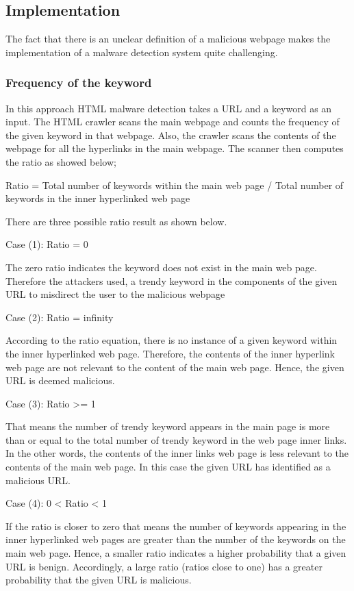 
\subsection{Implementation}
The fact that there is an unclear definition of a malicious webpage makes the implementation of a malware detection system quite challenging. 	  
	

\subsubsection{Frequency of the keyword}
 
In this approach HTML malware detection takes a URL and a keyword as an input. The HTML crawler scans the main webpage and counts the frequency of the given keyword in that webpage. Also, the crawler scans the contents of the webpage for all the hyperlinks in the main webpage. The scanner then computes the ratio as showed below;

Ratio = Total number of keywords within the main web page / Total number of keywords in the inner hyperlinked web page 

There are three possible ratio result as shown below. 

Case (1): Ratio = 0

The zero ratio indicates the keyword does not exist in the main web page. Therefore the attackers used, a trendy keyword in the components of the given URL to misdirect the user to the malicious webpage

Case (2): Ratio = infinity

According to the ratio equation, there is no instance of a given keyword within the inner hyperlinked web page. Therefore, the contents of the inner hyperlink web page are not relevant to the content of the main web page. Hence, the given URL is deemed malicious.

Case (3): Ratio >= 1

That means the number of trendy keyword appears in the main page is more than or equal to the total number of trendy keyword in the web page inner links. In the other words, the contents of the inner links web page is less relevant to the contents of the main web page. In this case the given URL has identified as a malicious URL. 

Case (4): 0 < Ratio < 1

If the ratio is closer to zero that means the number of keywords appearing in the inner hyperlinked web pages are greater than the number of the keywords on the main web page. Hence, a smaller ratio indicates a higher probability that a given URL is benign. Accordingly, a large ratio (ratios close to one) has a greater probability that the given URL is malicious. 

